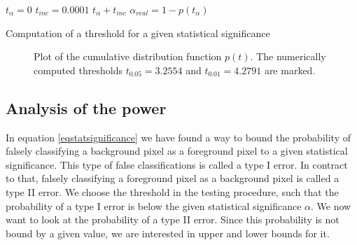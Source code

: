 \documentclass[a4paper,12pt]{article}
\theoremstyle{plain}
\theoremstyle{definition}
\begin{document}
\begin{algorithm}[H]
	$t_\alpha = 0$\;
	$t_{inc} = 0.0001$\;
	{
		$t_\alpha + t_{inc}$\;
		$\alpha_{real} = 1 - p(t_\alpha)$\;
	}
	\caption{Computation of a threshold for a given statistical significance}
\end{algorithm}

\begin{figure}[h!]
	\centering
	\caption{Plot of the cumulative distribution function $p(t)$. The numerically computed thresholds $t_{0.05} = 3.2554$ and $t_{0.01} = 4.2791$ are marked.}
	\label{figurecdf}
\end{figure}

\newpage

\subsection{Analysis of the power}\label{sectionpower}

In equation \eqref{eqstatsignificance} we have found a way to bound the probability of falsely classifying a background pixel as a foreground pixel to a given statistical significance. This type of false classifications is called a type I error. In contract to that, falsely classifying a foreground pixel as a background pixel is called a type II error. We choose the threshold in the testing procedure, such that the probability of a type I error is below the given statistical significance $\alpha$. We now want to look at the probability of a type II error. Since this probability is not bound by a given value, we are interested in upper and lower bounds for it.
\end{document}
